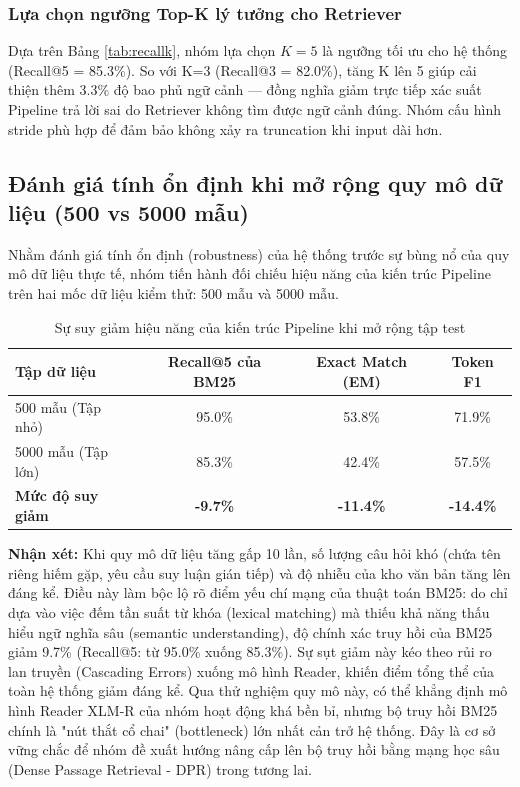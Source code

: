 \documentclass[12pt, a4paper]{article}
\begin{document}
\subsubsection{Lựa chọn ngưỡng Top-K lý tưởng cho Retriever}
Dựa trên Bảng \ref{tab:recallk}, nhóm lựa chọn $K=5$ là ngưỡng tối ưu cho hệ thống (Recall@5 = 85.3\%). So với K=3 (Recall@3 = 82.0\%), tăng K lên 5 giúp cải thiện thêm 3.3\% độ bao phủ ngữ cảnh --- đồng nghĩa giảm trực tiếp xác suất Pipeline trả lời sai do Retriever không tìm được ngữ cảnh đúng. Nhóm cấu hình stride phù hợp để đảm bảo không xảy ra truncation khi input dài hơn.

\subsection{Đánh giá tính ổn định khi mở rộng quy mô dữ liệu (500 vs 5000 mẫu)}
Nhằm đánh giá tính ổn định (robustness) của hệ thống trước sự bùng nổ của quy mô dữ liệu thực tế, nhóm tiến hành đối chiếu hiệu năng của kiến trúc Pipeline trên hai mốc dữ liệu kiểm thử: 500 mẫu và 5000 mẫu.

\begin{table}[H]
  \centering
  \small
  \caption{Sự suy giảm hiệu năng của kiến trúc Pipeline khi mở rộng tập test}
  \begin{tabular}{lccc}
    \toprule
    \textbf{Tập dữ liệu} & \textbf{Recall@5 của BM25} & \textbf{Exact Match (EM)} & \textbf{Token F1} \\
    \midrule
    500 mẫu (Tập nhỏ) & 95.0\% & 53.8\% & 71.9\% \\
    5000 mẫu (Tập lớn) & 85.3\% & 42.4\% & 57.5\% \\
    \midrule
    \textbf{Mức độ suy giảm} & \textbf{-9.7\%} & \textbf{-11.4\%} & \textbf{-14.4\%} \\
    \bottomrule
  \end{tabular}
  \label{tab:sosanh500}
\end{table}

\textbf{Nhận xét:} Khi quy mô dữ liệu tăng gấp 10 lần, số lượng câu hỏi khó (chứa tên riêng hiếm gặp, yêu cầu suy luận gián tiếp) và độ nhiễu của kho văn bản tăng lên đáng kể. Điều này làm bộc lộ rõ điểm yếu chí mạng của thuật toán BM25: do chỉ dựa vào việc đếm tần suất từ khóa (lexical matching) mà thiếu khả năng thấu hiểu ngữ nghĩa sâu (semantic understanding), độ chính xác truy hồi của BM25 giảm 9.7\% (Recall@5: từ 95.0\% xuống 85.3\%). Sự sụt giảm này kéo theo rủi ro lan truyền (Cascading Errors) xuống mô hình Reader, khiến điểm tổng thể của toàn hệ thống giảm đáng kể. Qua thử nghiệm quy mô này, có thể khẳng định mô hình Reader XLM-R của nhóm hoạt động khá bền bỉ, nhưng bộ truy hồi BM25 chính là "nút thắt cổ chai" (bottleneck) lớn nhất cản trở hệ thống. Đây là cơ sở vững chắc để nhóm đề xuất hướng nâng cấp lên bộ truy hồi bằng mạng học sâu (Dense Passage Retrieval - DPR) trong tương lai.
\end{document}

